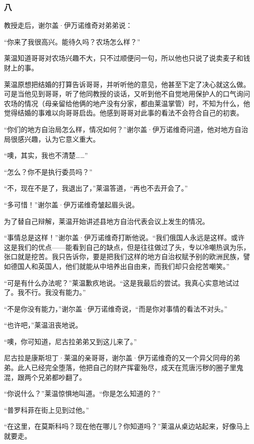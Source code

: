\subsubsection*{八}

\par 教授走后，谢尔盖·伊万诺维奇对弟弟说：
\par “你来了我很高兴。能待久吗？农场怎么样？”
\par 莱温知道哥哥对农场兴趣不大，只不过顺便问一句，所以他也只说了说卖麦子和钱财上的事。
\par 莱温原想把结婚的打算告诉哥哥，并听听他的意见，他甚至下定了决心就这么做。可是当他见到哥哥，听了他同教授的谈话，又听到他不自觉地用保护人的口气询问农场的情况（母亲留给他俩的地产没有分家，都由莱温掌管）时，不知为什么，他觉得结婚的事难以向哥哥启齿。他感到哥哥对此事的看法不会符合自己的初衷。
\par “你们的地方自治局怎么样，情况如何？”谢尔盖·伊万诺维奇问道，他对地方自治局很感兴趣，认为它意义重大。
\par “噢，其实，我也不清楚……”
\par “怎么？你不是执行委员吗？”
\par “不，现在不是了，我退出了，”莱温答道，“再也不去开会了。”
\par “多可惜！”谢尔盖·伊万诺维奇皱起眉头说。
\par 为了替自己辩解，莱温开始讲述县地方自治代表会议上发生的情况。
\par “事情总是这样！”谢尔盖·伊万诺维奇打断他说。“我们俄国人永远是这样。或许这是我们的优点——能看到自己的缺点，但是往往做过了头，专以冷嘲热讽为乐，张口就是挖苦。我只告诉你，要是把我们这样的地方自治权赋予别的欧洲民族，譬如德国人和英国人，他们就能从中培养出自由来，而我们却只会挖苦嘲笑。”
\par “可是有什么办法呢？”莱温歉疚地说。“这是我最后的尝试。我真心实意地试过了。我不行。我没有能力。”
\par “不是你没有能力，”谢尔盖·伊万诺维奇说，“而是你对事情的看法不对头。”
\par “也许吧，”莱温沮丧地说。
\par “噢，你可知道，尼古拉弟弟又到这儿来了。”
\par 尼古拉是康斯坦丁·莱温的亲哥哥，谢尔盖·伊万诺维奇的又一个异父同母的弟弟。此人已经完全堕落，他把自己的财产挥霍殆尽，成天在荒唐污秽的圈子里鬼混，跟两个兄弟都吵翻了。
\par “你说什么？”莱温惊惧地叫道。“你是怎么知道的？”
\par “普罗科菲在街上见到过他。”
\par “在这里，在莫斯科吗？现在他在哪儿？你知道吗？”莱温从桌边站起来，好像马上就要走。
